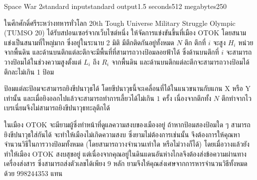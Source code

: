 \documentclass[11pt,a4paper]{article}
\begin{document}
\begin{problem}{Space War 2}{standard input}{standard output}{1.5 seconds}{512 megabytes}{250}

ในศึกศักดิ์ศรีระหว่างทหารทั่วโลก 20th Tough Universe Military Struggle Olympic (TUMSO 20) ได้รับสปอนเซอร์จากเว็บไซต์หนึ่ง ให้จัดการแข่งขันขึ้นที่เมือง OTOK โดยสนามแข่งเป็นสนามที่ใหญ่มาก ซึ่งอยู่ในระนาบ 2 มิติ มีตึกติดกันอยู่ทั้งหมด $N$ ตึก ตึกที่ $i$ จะสูง $H_i$ หน่วยจากพื้นดิน และด้านบนตึกแต่ละตึกจะมีพื้นที่ที่สามารถวางป้อมลอยฟ้าได้ ซึ่งด้านบนตึกที่ $i$ จะสามารถวางป้อมได้ในช่วงความสูงตั้งแต่ $L_i$ ถึง $R_i$ จากพื้นดิน และด้านบนตึกแต่ละตึกจะสามารถวางป้อมได้ตึกละไม่เกิน 1 ป้อม

ป้อมแต่ละป้อมจะสามารถยิงขีปนาวุธได้ โดยขีปนาวุธนี้จะเคลื่อนที่ได้ในแนวขนานกับแกน X หรือ Y เท่านั้น และเมื่อยิงออกไปแล้วจะสามารถทำการเลี้ยวได้ไม่เกิน $1$ ครั้ง เนื่องจากตึกทั้ง $N$ ตึกทำจากไวเบรเนี่ยมจึงไม่สามารถยิงขีปนาวุธทะลุตึกได้

ในเมือง OTOK จะมียามผู้ซึ่งทำหน้าที่ดูแลความสงบของเมืองอยู่ ถ้าหากป้อมสองป้อมใด ๆ สามารถยิงขีปนาวุธใส่กันได้ จะทำให้เมืองไม่เกิดความสงบ ซึ่งยามไม่ต้องการเช่นนั้น จึงต้องการให้คุณหาจำนวนวิธีในการวางป้อมทั้งหมด (โดยสามารถวางจำนวนเท่าใด หรือไม่วางก็ได้) โดยเมื่อวางแล้วยังทำให้เมือง OTOK สงบสุขอยู่ แต่เนื่องจากคุณอยู่ในดินแดนอันห่างไกลจึงต้องส่งข้อความผ่านทางเครื่องส่งสาร ซึ่งสามารถส่งตัวเลขได้เพียง 9 หลัก ยามจึงให้คุณส่งเศษจากการหารจำนวนวิธีทั้งหมดด้วย $998244353$ แทน

\begin{center}
\parindent {}
\end{center}
\end{problem}
\end{document}
